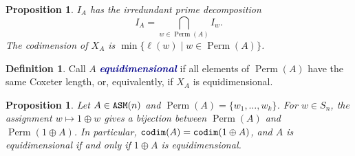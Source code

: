 \documentclass[12 pt]{amsart}
\DeclareMathOperator{\ASM}{{\tt ASM}}
\DeclareMathOperator{\codim}{{\tt codim}}
\DeclareMathOperator{\Perm}{Perm}
\theoremstyle{plain}
\newtheorem{prop}[thm]{Proposition}
\theoremstyle{definition}
\newtheorem{definition}[thm]{Definition}
\theoremstyle{remark}
\newcommand{\newword}[1]{\textcolor{darkblue}{\textbf{\emph{#1}}}}
\begin{document}
\begin{prop}\cite[Proposition 5.4]{Wei17}\label{prop:perm-set-decomposition} $I_A$ has the irredundant prime decomposition
\[
    I_A = \bigcap_{w \in \Perm(A)} I_w.
\]
The codimension of $X_A$ is $\min \{\ell(w) \mid w \in \Perm(A)\}$.
\end{prop}

\begin{definition}\label{def: equidim}
Call $A$ \newword{equidimensional} if all elements of $\Perm(A)$ have the same Coxeter length, or, equivalently, if $X_A$ is equidimensional.
\end{definition}


\begin{prop}\label{prop:permBij}
Let $A \in \ASM(n)$ and $\Perm(A) =\{w_1,\ldots,w_k\}$.  For $w \in S_n$, the assignment $w \mapsto 1 \oplus w$ gives a bijection between $\Perm(A)$ and $\Perm(1 \oplus A)$.  In particular, $
\codim(A)=\codim(1 \oplus A)$, and $A$ is equidimensional if and only if $1 \oplus A$ is equidimensional.
\end{prop}
\end{document}
